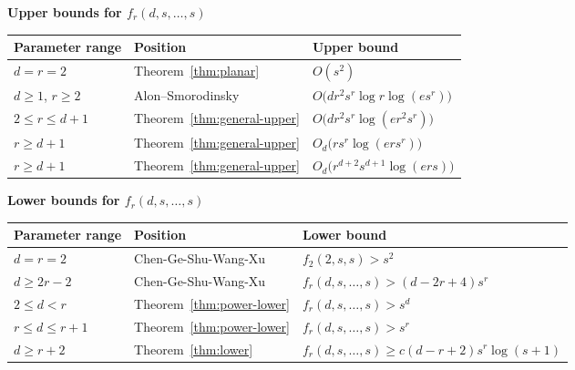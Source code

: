 \documentclass[11pt]{article}
\theoremstyle{definition}
\begin{document}
\begin{center}
\small
\textbf{Upper bounds for \(f_{r}(d,s,\ldots,s)\)}\par\smallskip
\renewcommand{\arraystretch}{1.18}
\begin{tabular}{@{}p{}p{}p{}@{}}
\toprule
Parameter range & Position & Upper bound \\
\midrule
\(d=r=2\) & Theorem~\ref{thm:planar} & \(O(s^{2})\) \\
\(d\ge1\), \(r\ge2\) & Alon--Smorodinsky \cite{AlonSmorodinsky2025} & \(O\bigl(dr^{2}s^{r}\log r\log(es^{r})\bigr)\) \\
\(2\le r\le d+1\) & Theorem~\ref{thm:general-upper} & \(O\bigl(dr^{2}s^{r}\log(er^{2}s^{r})\bigr)\) \\
\(r\ge d+1\) & Theorem~\ref{thm:general-upper} & \(O_{d}\bigl(rs^{r}\log(ers^{r})\bigr)\) \\
\(r\ge d+1\) & Theorem~\ref{thm:general-upper} & \(O_{d}\bigl(r^{d+2}s^{d+1}\log(ers)\bigr)\) \\
\bottomrule
\end{tabular}
\end{center}

\begin{center}
\small
\textbf{Lower bounds for \(f_{r}(d,s,\ldots,s)\)}\par\smallskip
\renewcommand{\arraystretch}{1.18}
\begin{tabular}{@{}p{}p{}p{}@{}}
\toprule
Parameter range & Position & Lower bound \\
\midrule
\(d=r=2\) & Chen-Ge-Shu-Wang-Xu~\cite{ChenGeShuWangXu2025} & \(f_{2}(2,s,s)>s^{2}\) \\
\(d\ge2r-2\) & Chen-Ge-Shu-Wang-Xu~\cite{ChenGeShuWangXu2025} & \(f_{r}(d,s,\ldots,s)>(d-2r+4)s^{r}\) \\
\(2\le d<r\) & Theorem~\ref{thm:power-lower} & \(f_{r}(d,s,\ldots,s)>s^{d}\) \\
\(r\le d\le r+1\) & Theorem~\ref{thm:power-lower} & \(f_{r}(d,s,\ldots,s)>s^{r}\) \\
\(d\ge r+2\) & Theorem~\ref{thm:lower} & \(f_{r}(d,s,\ldots,s)\ge c(d-r+2)s^{r}\log(s+1)\) \\
\bottomrule
\end{tabular}
\end{center}
\end{document}
